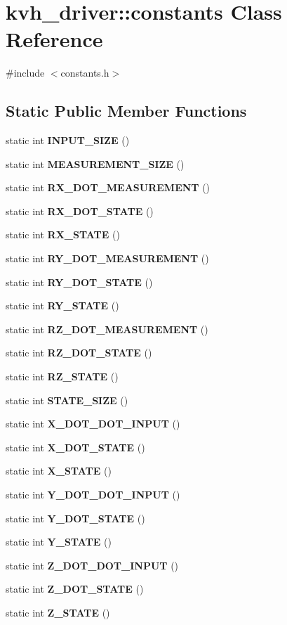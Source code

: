 \section{kvh\-\_\-driver\-:\-:constants \-Class \-Reference}
\label{classkvh__driver_1_1constants}


{\ttfamily \#include $<$constants.\-h$>$}

\subsection*{\-Static \-Public \-Member \-Functions}
\begin{DoxyCompactItemize}
\item 
static int {\bf \-I\-N\-P\-U\-T\-\_\-\-S\-I\-Z\-E} ()
\item 
static int {\bf \-M\-E\-A\-S\-U\-R\-E\-M\-E\-N\-T\-\_\-\-S\-I\-Z\-E} ()
\item 
static int {\bf \-R\-X\-\_\-\-D\-O\-T\-\_\-\-M\-E\-A\-S\-U\-R\-E\-M\-E\-N\-T} ()
\item 
static int {\bf \-R\-X\-\_\-\-D\-O\-T\-\_\-\-S\-T\-A\-T\-E} ()
\item 
static int {\bf \-R\-X\-\_\-\-S\-T\-A\-T\-E} ()
\item 
static int {\bf \-R\-Y\-\_\-\-D\-O\-T\-\_\-\-M\-E\-A\-S\-U\-R\-E\-M\-E\-N\-T} ()
\item 
static int {\bf \-R\-Y\-\_\-\-D\-O\-T\-\_\-\-S\-T\-A\-T\-E} ()
\item 
static int {\bf \-R\-Y\-\_\-\-S\-T\-A\-T\-E} ()
\item 
static int {\bf \-R\-Z\-\_\-\-D\-O\-T\-\_\-\-M\-E\-A\-S\-U\-R\-E\-M\-E\-N\-T} ()
\item 
static int {\bf \-R\-Z\-\_\-\-D\-O\-T\-\_\-\-S\-T\-A\-T\-E} ()
\item 
static int {\bf \-R\-Z\-\_\-\-S\-T\-A\-T\-E} ()
\item 
static int {\bf \-S\-T\-A\-T\-E\-\_\-\-S\-I\-Z\-E} ()
\item 
static int {\bf \-X\-\_\-\-D\-O\-T\-\_\-\-D\-O\-T\-\_\-\-I\-N\-P\-U\-T} ()
\item 
static int {\bf \-X\-\_\-\-D\-O\-T\-\_\-\-S\-T\-A\-T\-E} ()
\item 
static int {\bf \-X\-\_\-\-S\-T\-A\-T\-E} ()
\item 
static int {\bf \-Y\-\_\-\-D\-O\-T\-\_\-\-D\-O\-T\-\_\-\-I\-N\-P\-U\-T} ()
\item 
static int {\bf \-Y\-\_\-\-D\-O\-T\-\_\-\-S\-T\-A\-T\-E} ()
\item 
static int {\bf \-Y\-\_\-\-S\-T\-A\-T\-E} ()
\item 
static int {\bf \-Z\-\_\-\-D\-O\-T\-\_\-\-D\-O\-T\-\_\-\-I\-N\-P\-U\-T} ()
\item 
static int {\bf \-Z\-\_\-\-D\-O\-T\-\_\-\-S\-T\-A\-T\-E} ()
\item 
static int {\bf \-Z\-\_\-\-S\-T\-A\-T\-E} ()
\end{DoxyCompactItemize}


